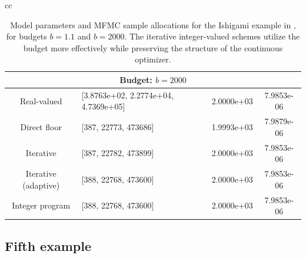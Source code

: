 \begin{table}[ht]
{\begin{tabular}{cc}
\begin{minipage}{0.73\linewidth}
\begin{tabular}{|c|p{4.9cm}|c|c|}
\multicolumn{4}{|c|}{\textbf{Budget: $b = 2000$}} \\ \hline

Real-valued 
& [3.8763e+02, 2.2774e+04, 4.7369e+05]
& 2.0000e+03 & 7.9853e-06 \\ \hline

Direct floor 
& [387, 22773, 473686]
& 1.9993e+03 & 7.9879e-06 \\ \hline

Iterative 
& [387, 22782, 473899]
& 2.0000e+03 & 7.9853e-06 \\ \hline

Iterative (adaptive)
& [388, 22768, 473600]
& 2.0000e+03 & 7.9853e-06 \\ \hline

Integer program
& [388, 22768, 473600]
& 2.0000e+03 & 7.9853e-06 \\ \hline

\end{tabular}
\end{minipage}

\end{tabular}
}
\caption{Model parameters and MFMC sample allocations for the Ishigami example in \cite{QiPeOMVe:2018}, for budgets $b=1.1$ and $b=2000$. The iterative integer-valued schemes utilize the budget more effectively while preserving the structure of the continuous optimizer.}
\label{tab:MFMC_integer_comparison_Eg4}
\end{table}


\subsection{Fifth example}



